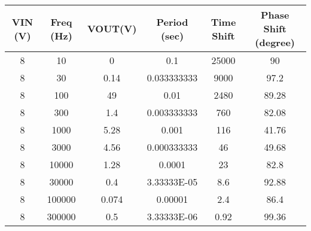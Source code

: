 \begin{tabular}{|c|c|c|c|c|c|}
\hline
VIN (V)&Freq (Hz)&VOUT(V)&Period (sec)&Time Shift&Phase Shift (degree)\\
\hline
8&10&0&0.1&25000&90\\
\hline
8&30&0.14&0.033333333&9000&97.2\\
\hline
8&100&49&0.01&2480&89.28\\
\hline
8&300&1.4&0.003333333&760&82.08\\
\hline
8&1000&5.28&0.001&116&41.76\\
\hline
8&3000&4.56&0.000333333&46&49.68\\
\hline
8&10000&1.28&0.0001&23&82.8\\
\hline
8&30000&0.4&3.33333E-05&8.6&92.88\\
\hline
8&100000&0.074&0.00001&2.4&86.4\\
\hline
8&300000&0.5&3.33333E-06&0.92&99.36\\
\hline
\end{tabular}
